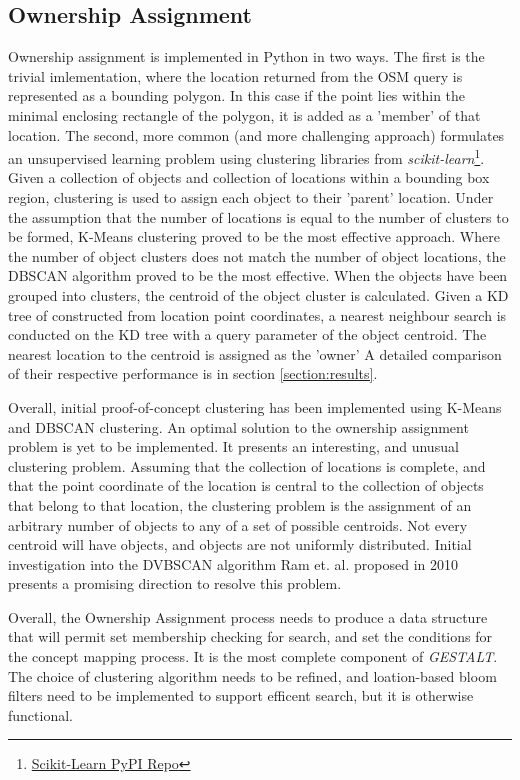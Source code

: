 \subsection{Ownership Assignment}
Ownership assignment is implemented in Python in two ways. The first is the trivial imlementation, where the location returned from the OSM query is represented as a bounding polygon. 
In this case if the point lies within the minimal enclosing rectangle of the polygon, it is added as a 'member' of that location. 
The second, more common (and more challenging approach) formulates an unsupervised learning problem using clustering libraries from \textit{scikit-learn}\footnote{\href{https://pypi.org/project/scikit-learn/}{Scikit-Learn PyPI Repo}}. 
Given a collection of objects and collection of locations within a bounding box region, clustering is used to assign each object to their 'parent' location. 
Under the assumption that the number of locations is equal to the number of clusters to be formed, K-Means clustering proved to be the most effective approach. 
Where the number of object clusters does not match the number of object locations, the DBSCAN algorithm proved to be the most effective. 
When the objects have been grouped into clusters, the centroid of the object cluster is calculated. Given a KD tree of constructed from location point coordinates, a nearest neighbour search is conducted on the KD tree with a query parameter of the object centroid. The nearest location to the centroid is assigned as the 'owner'
A detailed comparison of their respective performance is in section \ref{section:results}. 

Overall, initial proof-of-concept clustering has been implemented using K-Means and DBSCAN clustering. An optimal solution to the ownership assignment problem is yet to be implemented. 
It presents an interesting, and unusual clustering problem. 
Assuming that the collection of locations is complete, and that the point coordinate of the location is central to the collection of objects that belong to that location, the clustering problem is the assignment of an arbitrary number of objects to any of a set of possible centroids. Not every centroid will have objects, and objects are not uniformly distributed. Initial investigation into the DVBSCAN algorithm Ram et. al. proposed in 2010 presents a promising direction to resolve this problem.\cite{Ram2010} 

Overall, the Ownership Assignment process needs to produce a data structure that will permit set membership checking for search, and set the conditions for the concept mapping process. It is the most complete component of \textit{GESTALT}. The choice of clustering algorithm needs to be refined, and loation-based bloom filters need to be implemented to support efficent search, but it is otherwise functional. 


